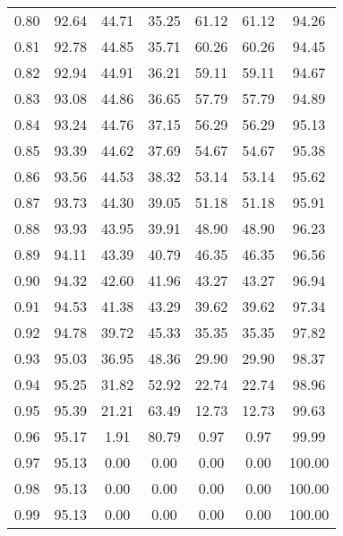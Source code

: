 \begin{tabular}{|c|c|c|c|c|c|c|}
      0.80 &     92.64 &     44.71 &      35.25 &   61.12 &      61.12 &         94.26 \\
      0.81 &     92.78 &     44.85 &      35.71 &   60.26 &      60.26 &         94.45 \\
      0.82 &     92.94 &     44.91 &      36.21 &   59.11 &      59.11 &         94.67 \\
      0.83 &     93.08 &     44.86 &      36.65 &   57.79 &      57.79 &         94.89 \\
      0.84 &     93.24 &     44.76 &      37.15 &   56.29 &      56.29 &         95.13 \\
      0.85 &     93.39 &     44.62 &      37.69 &   54.67 &      54.67 &         95.38 \\
      0.86 &     93.56 &     44.53 &      38.32 &   53.14 &      53.14 &         95.62 \\
      0.87 &     93.73 &     44.30 &      39.05 &   51.18 &      51.18 &         95.91 \\
      0.88 &     93.93 &     43.95 &      39.91 &   48.90 &      48.90 &         96.23 \\
      0.89 &     94.11 &     43.39 &      40.79 &   46.35 &      46.35 &         96.56 \\
      0.90 &     94.32 &     42.60 &      41.96 &   43.27 &      43.27 &         96.94 \\
      0.91 &     94.53 &     41.38 &      43.29 &   39.62 &      39.62 &         97.34 \\
      0.92 &     94.78 &     39.72 &      45.33 &   35.35 &      35.35 &         97.82 \\
      0.93 &     95.03 &     36.95 &      48.36 &   29.90 &      29.90 &         98.37 \\
      0.94 &     95.25 &     31.82 &      52.92 &   22.74 &      22.74 &         98.96 \\
      0.95 &     95.39 &     21.21 &      63.49 &   12.73 &      12.73 &         99.63 \\
      0.96 &     95.17 &      1.91 &      80.79 &    0.97 &       0.97 &         99.99 \\
      0.97 &     95.13 &      0.00 &       0.00 &    0.00 &       0.00 &        100.00 \\
      0.98 &     95.13 &      0.00 &       0.00 &    0.00 &       0.00 &        100.00 \\
      0.99 &     95.13 &      0.00 &       0.00 &    0.00 &       0.00 &        100.00 \\
\bottomrule
\end{tabular}
